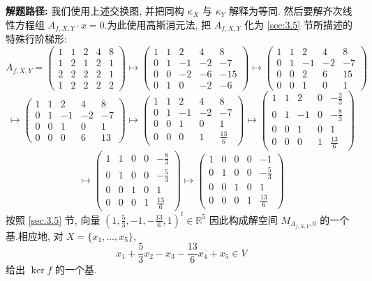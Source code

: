 \noindent\textbf{解题路径:} 我们使用上述交换图, 并把同构 $\kappa_X$ 与 $\kappa_Y$ 解释为等同.
然后要解齐次线性方程组 $A_{f, X, Y} \cdot x = 0$.为此使用高斯消元法, 把 $A_{f, X, Y}$ 化为
\ref{sec:3.5} 节所描述的特殊行阶梯形:
\[
A_{f, X, Y} = \begin{pmatrix} 1 & 1 & 2 & 4 & 8 \\ 1 & 2 & 1 & 2 & 1 \\ 2 & 2 & 2 & 2 & 1 \\ 1 & 2 & 2 & 2 & 2 \end{pmatrix}
\longmapsto \begin{pmatrix} 1 & 1 & 2 & 4 & 8 \\ 0 & 1 & -1 & -2 & -7 \\ 0 & 0 & -2 & -6 & -15 \\ 0 & 1 & 0 & -2 & -6 \end{pmatrix}
\longmapsto \begin{pmatrix} 1 & 1 & 2 & 4 & 8 \\ 0 & 1 & -1 & -2 & -7 \\ 0 & 0 & 2 & 6 & 15 \\ 0 & 0 & 1 & 0 & 1 \end{pmatrix}
\]
\[
\longmapsto \begin{pmatrix} 1 & 1 & 2 & 4 & 8 \\ 0 & 1 & -1 & -2 & -7 \\ 0 & 0 & 1 & 0 & 1 \\ 0 & 0 & 0 & 6 & 13 \end{pmatrix}
\longmapsto \begin{pmatrix} 1 & 1 & 2 & 4 & 8 \\ 0 & 1 & -1 & -2 & -7 \\ 0 & 0 & 1 & 0 & 1 \\ 0 & 0 & 0 & 1 & \frac{13}{6} \end{pmatrix}
\longmapsto \begin{pmatrix} 1 & 1 & 2 & 0 & -\frac{2}{3} \\ 0 & 1 & -1 & 0 & -\frac{8}{3} \\ 0 & 0 & 1 & 0 & 1 \\ 0 & 0 & 0 & 1 & \frac{13}{6} \end{pmatrix}
\]
\[
\longmapsto \begin{pmatrix} 1 & 1 & 0 & 0 & -\frac{8}{3} \\ 0 & 1 & 0 & 0 & -\frac{5}{3} \\ 0 & 0 & 1 & 0 & 1 \\ 0 & 0 & 0 & 1 & \frac{13}{6} \end{pmatrix}
\longmapsto \begin{pmatrix} 1 & 0 & 0 & 0 & -1 \\ 0 & 1 & 0 & 0 & -\frac{5}{3} \\ 0 & 0 & 1 & 0 & 1 \\ 0 & 0 & 0 & 1 & \frac{13}{6} \end{pmatrix}
\]
按照 \ref{sec:3.5} 节, 向量 $(1, \frac{5}{3}, -1, -\frac{13}{6}, 1)^t \in \mathbb{R}^5$ 因此构成解空间
$M_{A_{f, X, Y}, 0}$ 的一个基.相应地, 对 $X = \{x_1, \ldots, x_5\}$,
\[
x_1 + \frac{5}{3}x_2 - x_3 - \frac{13}{6}x_4 + x_5 \in V
\]
给出 $\ker f$ 的一个基.

